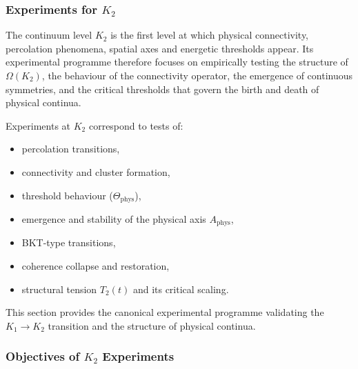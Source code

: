 
\subsubsection{Experiments for \texorpdfstring{$K_2$}{K_2}}
\label{sec:experiments-k2}

The continuum level $K_2$ is the first level at which physical connectivity,
percolation phenomena, spatial axes and energetic thresholds appear.
Its experimental programme therefore focuses on empirically testing the
structure of $\Omega(K_2)$, the behaviour of the connectivity operator,
the emergence of continuous symmetries, and the critical thresholds that
govern the birth and death of physical continua.

Experiments at $K_2$ correspond to tests of:
\begin{itemize}
    \item percolation transitions,
    \item connectivity and cluster formation,
    \item threshold behaviour ($\Theta_{\mathrm{phys}}$),
    \item emergence and stability of the physical axis $A_{\mathrm{phys}}$,
    \item BKT-type transitions,
    \item coherence collapse and restoration,
    \item structural tension $T_2(t)$ and its critical scaling.
\end{itemize}

This section provides the canonical experimental programme validating the
$K_1 \rightarrow K_2$ transition and the structure of physical continua.



\subsubsection{Objectives of \texorpdfstring{$K_2$}{K_2} Experiments}

